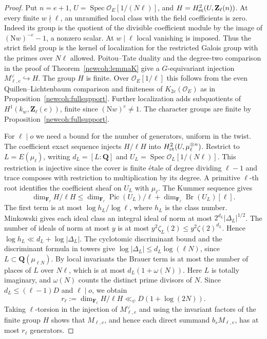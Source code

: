 \begin{proof}
Put \(n=e+1\), \(U=\operatorname{Spec}\mathcal O_E[1/(N\ell)]\), and
\(H=H^2_{\rm et}(U,\mathbf Z_\ell(n))\). At every finite
\(w\nmid\ell\), an unramified local class with the field coefficients
is zero. Indeed its group is the quotient of the divisible coefficient
module by the image of \((\mathrm Nw)^{-e}-1\), a nonzero scalar.
At \(w\mid\ell\) local vanishing is imposed. Thus the strict field
group is the kernel of localization for the restricted Galois group
with the primes over \(N\ell\) allowed. Poitou--Tate duality and the
degree-two comparison in the proof of Theorem~\ref{newcoh:lemmaK}
give a \(G\)-equivariant injection \(M_{\ell,e}^{\vee}\hookrightarrow H\).
The group \(H\) is finite. Over \(\mathcal O_E[1/\ell]\) this follows
from the even Quillen--Lichtenbaum comparison and finiteness of
\(K_{2e}(\mathcal O_E)\) as in Proposition~\ref{newcoh:fullsupport}.
Further localization adds subquotients of
\(H^1(k_w,\mathbf Z_\ell(e))\), finite since \((\mathrm Nw)^e\ne1\).
The character groups are finite by Proposition~\ref{newcoh:fullsupport}.

For \(\ell\mid o\) we need a bound for the number of generators,
uniform in the twist. The coefficient exact sequence injects
\(H/\ell H\) into \(H^2_{\rm et}(U,\mu_\ell^{\otimes n})\). Restrict
to \(L=E(\mu_\ell)\), writing \(d_L=[L:\mathbf Q]\) and
\(U_L=\operatorname{Spec}\mathcal O_L[1/(N\ell)]\). This restriction
is injective since the cover is finite \'etale of degree dividing
\(\ell-1\) and trace composes with restriction to multiplication by its
degree. A primitive \(\ell\)-th root identifies the coefficient sheaf
on \(U_L\) with \(\mu_\ell\). The Kummer sequence gives
\[
 \dim_{\mathbf F_\ell} H/\ell H
 \le \dim_{\mathbf F_\ell}\operatorname{Pic}(U_L)/\ell
       +\dim_{\mathbf F_\ell}\operatorname{Br}(U_L)[\ell].
\]
The first term is at most \(\log h_L/\log\ell\), where \(h_L\) is
the class number. Minkowski gives each ideal class an integral ideal
of norm at most \(2^{d_L}|\Delta_L|^{1/2}\). The number of ideals
of norm at most \(y\) is at most \(y^2\zeta_L(2)\le y^2\zeta(2)^{d_L}\).
Hence \(\log h_L\ll d_L+\log|\Delta_L|\). The cyclotomic discriminant
bound and the discriminant formula in towers give
\(\log|\Delta_L|\le d_L\log(\ell N)\), since \(L\subset\mathbf Q(\mu_{\ell N})\).
By local invariants the Brauer term is at most the number of places
of \(L\) over \(N\ell\), which is at most \(d_L(1+\omega(N))\).
Here \(L\) is totally imaginary, and \(\omega(N)\) counts the distinct
prime divisors of \(N\). Since \(d_L\le(\ell-1)D\) and \(\ell\mid o\),
we obtain
\[
 r_\ell:=\dim_{\mathbf F_\ell} H/\ell H
       \ll_\psi D(1+\log(2N)).
\]
Taking \(\ell\)-torsion in the injection of \(M_{\ell,e}^{\vee}\)
and using the invariant factors of the finite group \(H\) shows that
\(M_{\ell,e}\), and hence each direct summand \(b_s M_{\ell,e}\),
has at most \(r_\ell\) generators.


\end{proof}
